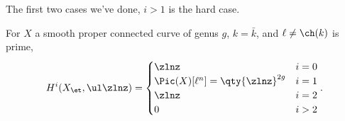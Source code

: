The first two cases we've done, \(i>1\) is the hard case.

\begin{corollary}[?]

For \(X\) a smooth proper connected curve of genus \(g\), \(k=\bar k\),
and \(\ell \neq \ch(k)\) is prime,
\begin{align*}  
H^i(X_\et, \ul \zlnz)
=
\begin{cases}
\zlnz & i = 0 \\
\Pic(X)[\ell^n] = \qty{\zlnz}^{2g} & i=1 \\
\zlnz & i=2 \\
0 & i>2
\end{cases}
.\end{align*}

\end{corollary}

